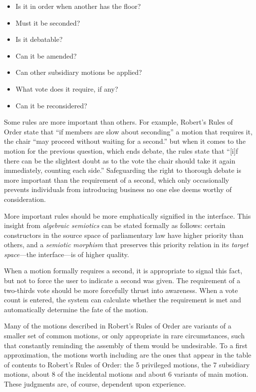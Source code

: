 \documentclass{acm_proc_article-sp}
\begin{document}
\begin{itemize}
 \item Is it in order when another has the floor?
 \item Must it be seconded?
 \item Is it debatable?
 \item Can it be amended?
 \item Can other subsidiary motions be applied?
 \item What vote does it require, if any?
 \item Can it be reconsidered?
\end{itemize}

Some rules are more important than others. For example, Robert's Rules of Order state that ``if members are slow about seconding'' a motion that requires it, the chair ``may proceed without waiting for a second.'' but when it comes to the motion for the previous question, which ends debate, the rules state that ``[i]f there can be the slightest doubt as to the vote the chair should take it again immediately, counting each side.'' Safeguarding the right to thorough debate is more important than the requirement of a second, which only occasionally prevents individuals from introducing business no one else deems worthy of consideration.

More important rules should be more emphatically signified in the interface. This insight from \emph{algebraic semiotics} \cite{goguen:information,goguen:introduction} can be stated formally as follows: certain constructors in the source space of parliamentary law have higher priority than others, and a \emph{semiotic morphism} that preserves this priority relation in its \emph{target space}---the interface---is of higher quality.

When a motion formally requires a second, it is appropriate to signal this fact, but not to force the user to indicate a second was given. The requirement of a two-thirds vote should be more forcefully thrust into awareness. When a vote count is entered, the system can calculate whether the requirement is met and automatically determine the fate of the motion.

Many of the motions described in Robert's Rules of Order are variants of a smaller set of common motions, or only appropriate in rare circumstances, such that constantly reminding the assembly of them would be undesirable. To a first approximation, the motions worth including are the ones that appear in the table of contents to Robert's Rules of Order: the 5 privileged motions, the 7 subsidiary motions, about 8 of the incidental motions and about 6 variants of main motion. These judgments are, of course, dependent upon experience.
\end{document}
